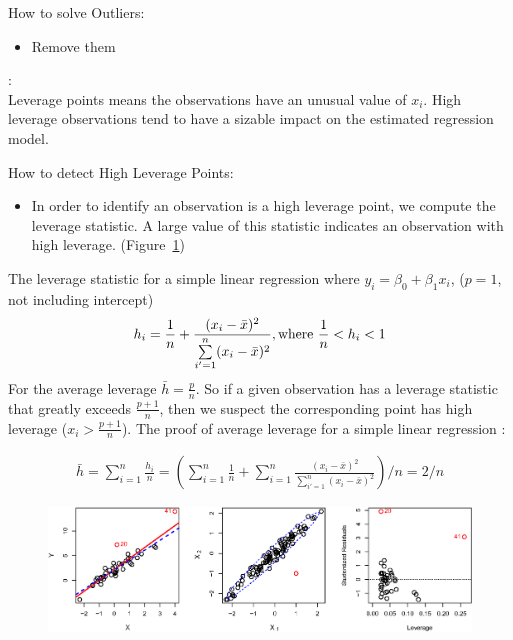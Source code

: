     \documentclass[12pt,fleqn,a4paper]{article}%
\theoremstyle{definition}
\theoremstyle{plain}
\numberwithin{equation}{section}
\begin{document}
How to solve Outliers:
\begin{itemize}
\item Remove them
\end{itemize}
\textbf{\color{blue}{5. High Leverage Points}}:\\
Leverage points means the observations have an unusual value of $x_{i}$. 
High leverage observations tend to have a sizable impact on the estimated regression model.

How to detect High Leverage Points:
\begin{itemize}
\item In order to identify an observation is a high leverage point, we compute the leverage statistic. 
A large value of this statistic indicates an observation with high leverage. (Figure~\ref{figure-3.13})
\end{itemize}
The leverage statistic for a simple linear regression where $y_{i} = \beta_{0} + \beta_{1}x_{i}$, ($p=1$, not including intercept)
\begin{gather}
h_{i} = \frac{1}{n} + \frac{(x_{i}-\bar{x})^{2}}{\sum\limits_{i'=1}^{n}(x_{i}-\bar{x})^{2}},{\rm where~} \frac{1}{n}<h_{i}<1
\end{gather}
For the average leverage $ \bar{h}= \frac{p}{n}$. So if a given observation has a leverage statistic that greatly exceeds $\frac{p+1}{n}$, then we suspect the corresponding point has high leverage ($x_{i}>\frac{p+1}{n} $). 
The proof of average leverage for a simple linear regression :

\begin{gather}
\bar{h} = \sum\limits_{i=1}^{n}\frac{h_{i}}{n} = \left(\sum\limits_{i=1}^{n} \frac{1}{n} + \sum\limits_{i=1}^{n} \frac{(x_{i}-\bar{x})^{2}}{\sum\limits_{i'=1}^{n}(x_{i}-\bar{x})^{2}}\right)/n = 2/n 
\end{gather}

\begin{figure}[H]
\centering
\includegraphics[scale=0.85]{images//3_13.eps}
\\~\\
\caption{}\label{figure-3.13}
\end{figure}
\end{document}
